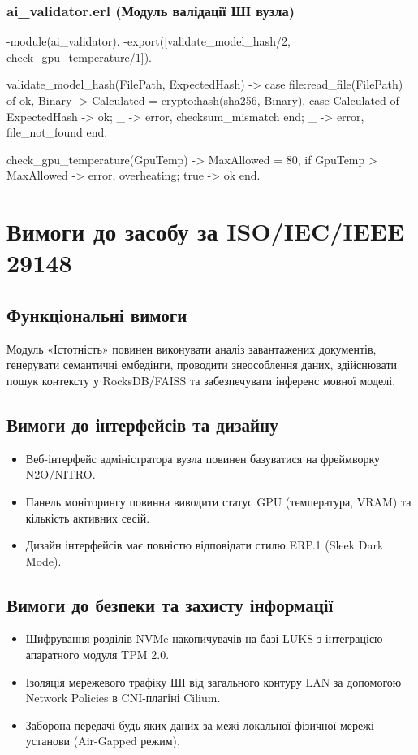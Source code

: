 \documentclass{article}
\let\originalfootnotesize\footnotesize
\let\oldverbatim\verbatim
\let\oldendverbatim\endverbatim
\renewenvironment{verbatim}{\originalfootnotesize\oldverbatim}{\oldendverbatim}
\begin{document}
\subsubsection{ai\_validator.erl (Модуль валідації ШІ вузла)}
\begin{verbatim}
-module(ai_validator).
-export([validate_model_hash/2, check_gpu_temperature/1]).

validate_model_hash(FilePath, ExpectedHash) ->
    case file:read_file(FilePath) of
        {ok, Binary} ->
            Calculated = crypto:hash(sha256, Binary),
            case Calculated of
                ExpectedHash -> ok;
                _ -> {error, checksum_mismatch}
            end;
        _ -> {error, file_not_found}
    end.

check_gpu_temperature(GpuTemp) ->
    MaxAllowed = 80,
    if
        GpuTemp > MaxAllowed -> {error, overheating};
        true -> ok
    end.
\end{verbatim}

\newpage
\section{Вимоги до засобу за ISO/IEC/IEEE 29148}

\subsection{Функціональні вимоги}
Модуль «Істотність» повинен виконувати аналіз завантажених документів, генерувати семантичні ембедінги, проводити знеособлення даних, здійснювати пошук контексту у RocksDB/FAISS та забезпечувати інференс мовної моделі.

\subsection{Вимоги до інтерфейсів та дизайну}
\begin{itemize}
    \item Веб-інтерфейс адміністратора вузла повинен базуватися на фреймворку N2O/NITRO.
    \item Панель моніторингу повинна виводити статус GPU (температура, VRAM) та кількість активних сесій.
    \item Дизайн інтерфейсів має повністю відповідати стилю ERP.1 (Sleek Dark Mode).
\end{itemize}

\subsection{Вимоги до безпеки та захисту інформації}
\begin{itemize}
    \item Шифрування розділів NVMe накопичувачів на базі LUKS з інтеграцією апаратного модуля TPM 2.0.
    \item Ізоляція мережевого трафіку ШІ від загального контуру LAN за допомогою Network Policies в CNI-плагіні Cilium.
    \item Заборона передачі будь-яких даних за межі локальної фізичної мережі установи (Air-Gapped режим).
\end{itemize}
\end{document}
